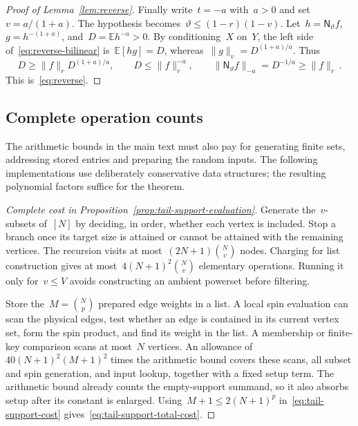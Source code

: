 \documentclass[10pt]{article}
\theoremstyle{plain}
\theoremstyle{definition}
\theoremstyle{remark}
\begin{document}
\begin{proof}[Proof of Lemma~\ref{lem:reverse}]
Finally write~$t=-a$ with~$a>0$ and set~$v=a/(1+a)$. The hypothesis becomes~$\vartheta\le(1-r)(1-v)$. Let~$h=\mathsf N_\vartheta f$, $g=h^{-(1+a)}$, and~$D=\mathbb E h^{-a}>0$. By conditioning~$X$ on~$Y$, the left side of~\eqref{eq:reverse-bilinear} is~$\mathbb E[hg]=D$, whereas~$\|g\|_v=D^{(1+a)/a}$. Thus
\begin{equation*}
 D\ge\|f\|_rD^{(1+a)/a},\qquad
 D\le\|f\|_r^{-a},\qquad
 \|\mathsf N_\vartheta f\|_{-a}=D^{-1/a}\ge\|f\|_r\,.
\end{equation*}
This is~\eqref{eq:reverse}.
\end{proof}

\subsection{Complete operation counts}\label{app:operations}
The arithmetic bounds in the main text must also pay for generating finite sets, addressing stored entries and preparing the random inputs. The following implementations use deliberately conservative data structures; the resulting polynomial factors suffice for the theorem.

\label{app:higher-cost}
\begin{proof}[Complete cost in Proposition~\ref{prop:tail-support-evaluation}]
Generate the~$v$-subsets of~$[N]$ by deciding, in order, whether each vertex is included. Stop a branch once its target size is attained or cannot be attained with the remaining vertices. The recursion visits at most~$(2N+1)\binom Nv$ nodes. Charging for list construction gives at most~$4(N+1)^2\binom Nv$ elementary operations. Running it only for~$v\le V$ avoids constructing an ambient powerset before filtering.

Store the~$M=\binom Np$ prepared edge weights in a list. A local spin evaluation can scan the physical edges, test whether an edge is contained in its current vertex set, form the spin product, and find its weight in the list. A membership or finite-key comparison scans at most~$N$ vertices. An allowance of~$40(N+1)^2(M+1)^2$ times the arithmetic bound covers these scans, all subset and spin generation, and input lookup, together with a fixed setup term. The arithmetic bound already counts the empty-support summand, so it also absorbs setup after its constant is enlarged. Using~$M+1\le2(N+1)^p$ in~\eqref{eq:tail-support-cost} gives~\eqref{eq:tail-support-total-cost}.
\end{proof}
\end{document}
